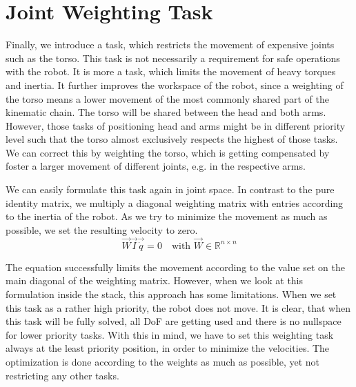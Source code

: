 \section{Joint Weighting Task}
Finally, we introduce a task, which restricts the movement of expensive joints such as the torso. This task is not necessarily a requirement for safe operations with the robot. It is more a task, which limits the movement of heavy torques and inertia. It further improves the workspace of the robot, since a weighting of the torso means a lower movement of the most commonly shared part of the kinematic chain. The torso will be shared between the head and both arms. However, those tasks of positioning head and arms might be in different priority level such that the torso almost exclusively respects the highest of those tasks. We can correct this by weighting the torso, which is getting compensated by foster a larger movement of different joints, e.g. in the respective arms.

We can easily formulate this task again in joint space. In contrast to the pure identity matrix, we multiply a diagonal weighting matrix with entries according to the inertia of the robot. As we try to minimize the movement as much as possible, we set the resulting velocity to zero.  
\begin{equation}
\vec{W} \vec{I} \vec{\dot{q}} = 0 \quad \text{with } \vec{W} \in \mathbb{R}^{n \times n}
\end{equation}

The equation successfully limits the movement according to the value set on the main diagonal of the weighting matrix. However, when we look at this formulation inside the stack, this approach has some limitations. When we set this task as a rather high priority, the robot does not move. It is clear, that when this task will be fully solved, all DoF are getting used and there is no nullspace for lower priority tasks. With this in mind, we have to set this weighting task always at the least priority position, in order to minimize the velocities. The optimization is done according to the weights as much as possible, yet not restricting any other tasks.


